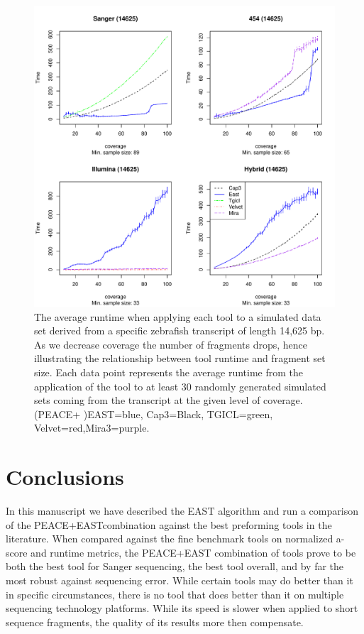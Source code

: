 \documentclass[10pt]{bmc_article}
\newcommand{\peace} {{\small PEACE}}
\newcommand{\capthree} {{\small Cap3}}
\newcommand{\tgicl} {{\small TGICL}}
\newcommand{\east} {{\small EAST}}
\newcommand{\velvet}{{\small Velvet}}
\newcommand{\mira}{{\small Mira3}}
\newcommand{\peast}{{\small PEACE+EAST}}
\newenvironment{bmcformat}{\begin{raggedright}\baselineskip20pt\sloppy\setboolean{publ}{false}}{\end{raggedright}\baselineskip20pt\sloppy}
\begin{document}
\begin{bmcformat}
\begin{figure}[htb]
\centerline{\includegraphics[width=6in]{pics.d/runtime_bycoverage_all.pdf}}
\caption{The average runtime when applying each tool to a simulated
  data set derived from a specific zebrafish transcript of length
  14,625 bp.  As we decrease coverage the number of fragments drops,
  hence illustrating the relationship between tool runtime and
  fragment set size.  Each data point represents the average runtime
  from the application of the tool to at least 30 randomly generated
  simulated sets coming from the transcript at the given level of coverage.
  (\peace + )\east=blue, \capthree=Black, \tgicl=green,
  \velvet=red,\mira=purple.}
\label{runtime.coverage}
\end{figure}



\section*{Conclusions}

In this manuscript we have described the \east\/ algorithm and run a
comparison of the \peast combination against the best preforming tools
in the literature.  When compared against the fine benchmark tools on
normalized a-score and runtime metrics, the \peast\/ combination of
tools prove to be both the best tool for Sanger sequencing, the
best tool overall, and by far the most robust against sequencing
error.  While certain tools may do better than it in specific circumstances,
there is no tool that does better than it on multiple sequencing
technology platforms.  While its speed is slower when applied to short
sequence fragments, the quality of its results more then compensate.


\end{bmcformat}
\end{document}
